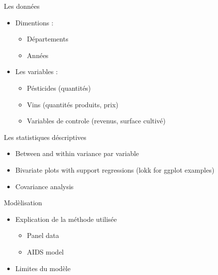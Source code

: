 \documentclass[11pt,ignorenonframetext,]{beamer}
\providecommand{\tightlist}{%
  \setlength{\itemsep}{0pt}\setlength{\parskip}{0pt}}
\begin{document}
\begin{frame}{Les données}
\protect\hypertarget{les-donnees}{}

\begin{itemize}
\tightlist
\item
  Dimentions :

  \begin{itemize}
  \tightlist
  \item
    Départements
  \item
    Années
  \end{itemize}
\item
  Les variables :

  \begin{itemize}
  \tightlist
  \item
    Pésticides (quantités)
  \item
    Vins (quantités produits, prix)
  \item
    Variables de controle (revenus, surface cultivé)
  \end{itemize}
\end{itemize}

\end{frame}

\begin{frame}{Les statistiques déscriptives}
\protect\hypertarget{les-statistiques-descriptives}{}

\begin{itemize}
\tightlist
\item
  Between and within variance par variable
\item
  Bivariate plots with support regressions (lokk for ggplot examples)
\item
  Covariance analysis
\end{itemize}

\end{frame}

\begin{frame}{Modèlisation}
\protect\hypertarget{modelisation}{}

\begin{itemize}
\tightlist
\item
  Explication de la méthode utilisée

  \begin{itemize}
  \tightlist
  \item
    Panel data
  \item
    AIDS model
  \end{itemize}
\item
  Limites du modèle
\end{itemize}

\end{frame}
\end{document}
